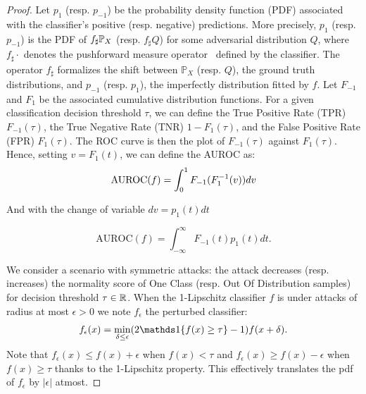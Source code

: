\begin{proof}


Let $p_1$ (resp. $p_{-1}$) be the probability density function (PDF) associated with the classifier's positive (resp. negative) predictions. More precisely, $p_1$ (resp. $p_{-1}$) is the PDF of $f_{\sharp}\mathbb{P}_X$ (resp. $f_{\sharp}Q$) for some adversarial distribution $Q$, where $f_{\sharp}\cdot$ denotes the pushforward measure operator~\cite{bogachev2007measure} defined by the classifier. The operator $f_{\sharp}$ formalizes the shift between $\mathbb{P}_X$ (resp. $Q$), the ground truth distributions, and $p_{-1}$ (resp. $p_1$), the imperfectly distribution fitted by $f$. Let $F_{-1}$ and $F_1$ be the associated cumulative distribution functions. For a given classification decision threshold $\tau$, we can define the True Positive Rate (TPR) $F_{-1}(\tau)$, the True Negative Rate (TNR) $1 - F_1(\tau)$, and the False Positive Rate (FPR) $F_{1}(\tau)$. The ROC curve is then the plot of $F_{-1}(\tau)$ against $F_{1}(\tau)$. Hence, setting $v = F_1(t)$, we can define the AUROC as:
\begin{equation}
    \text{AUROC}(f) = \int_{0}^{1} F_{-1}(F_1^{-1}(v))dv\\
\end{equation}

And with the change of variable $dv = p_1(t)dt$

\begin{equation}
    \text{AUROC}(f) = \int_{-\infty}^{\infty} F_{-1}(t)p_1(t)dt.
\end{equation}

We consider a scenario with symmetric attacks: the attack decreases (resp. increases) the normality score of One Class (resp. Out Of Distribution samples) for decision threshold $\tau\in\mathbb{R}$. When the 1-Lipschitz classifier $f$ is under attacks of radius at most $\epsilon>0$ we note $f_{\epsilon}$ the perturbed classifier:
\begin{equation}
    f_{\epsilon}(x)=\min_{\delta \leq \epsilon} (2\indicator\{f(x)\geq \tau\}-1) f(x + \delta).
\end{equation}
Note that $f_{\epsilon}(x)\leq f(x)+\epsilon$ when $f(x)<\tau$ and $f_{\epsilon}(x)\geq f(x)-\epsilon$ when $f(x)\geq \tau$ thanks to the 1-Lipschitz property. This effectively translates the pdf of $f_{\epsilon}$ by $|\epsilon|$ atmost.  
  

\end{proof}
